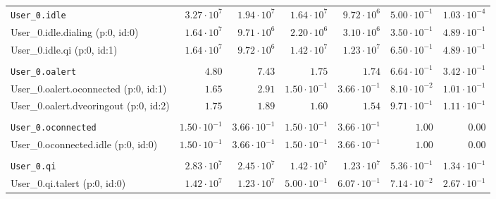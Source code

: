 \begin{table}[htbp]
{\begin{tabular}{lrrrrrr}
\\[-8pt]\texttt{User\_0.idle}                        &  $3.27 \cdot 10^{7}$ &  $1.94 \cdot 10^{7}$ &  $1.64 \cdot 10^{7}$ &  $9.72 \cdot 10^{6}$ & $5.00 \cdot 10^{-1}$ & $1.03 \cdot 10^{-4}$ \\
\hspace{3mm}User\_0.idle.dialing (p:0, id:0)         &  $1.64 \cdot 10^{7}$ &  $9.71 \cdot 10^{6}$ &  $2.20 \cdot 10^{6}$ &  $3.10 \cdot 10^{6}$ & $3.50 \cdot 10^{-1}$ & $4.89 \cdot 10^{-1}$ \\
\hspace{3mm}User\_0.idle.qi (p:0, id:1)              &  $1.64 \cdot 10^{7}$ &  $9.72 \cdot 10^{6}$ &  $1.42 \cdot 10^{7}$ &  $1.23 \cdot 10^{7}$ & $6.50 \cdot 10^{-1}$ & $4.89 \cdot 10^{-1}$ \\
\\[-8pt]\texttt{User\_0.oalert}                      &               $4.80$ &               $7.43$ &               $1.75$ &               $1.74$ & $6.64 \cdot 10^{-1}$ & $3.42 \cdot 10^{-1}$ \\
\hspace{3mm}User\_0.oalert.oconnected (p:0, id:1)    &               $1.65$ &               $2.91$ & $1.50 \cdot 10^{-1}$ & $3.66 \cdot 10^{-1}$ & $8.10 \cdot 10^{-2}$ & $1.01 \cdot 10^{-1}$ \\
\hspace{3mm}User\_0.oalert.dveoringout (p:0, id:2)   &               $1.75$ &               $1.89$ &               $1.60$ &               $1.54$ & $9.71 \cdot 10^{-1}$ & $1.11 \cdot 10^{-1}$ \\
\\[-8pt]\texttt{User\_0.oconnected}                  & $1.50 \cdot 10^{-1}$ & $3.66 \cdot 10^{-1}$ & $1.50 \cdot 10^{-1}$ & $3.66 \cdot 10^{-1}$ &               $1.00$ &               $0.00$ \\
\hspace{3mm}User\_0.oconnected.idle (p:0, id:0)      & $1.50 \cdot 10^{-1}$ & $3.66 \cdot 10^{-1}$ & $1.50 \cdot 10^{-1}$ & $3.66 \cdot 10^{-1}$ &               $1.00$ &               $0.00$ \\
\\[-8pt]\texttt{User\_0.qi}                          &  $2.83 \cdot 10^{7}$ &  $2.45 \cdot 10^{7}$ &  $1.42 \cdot 10^{7}$ &  $1.23 \cdot 10^{7}$ & $5.36 \cdot 10^{-1}$ & $1.34 \cdot 10^{-1}$ \\
\hspace{3mm}User\_0.qi.talert (p:0, id:0)            &  $1.42 \cdot 10^{7}$ &  $1.23 \cdot 10^{7}$ & $5.00 \cdot 10^{-1}$ & $6.07 \cdot 10^{-1}$ & $7.14 \cdot 10^{-2}$ & $2.67 \cdot 10^{-1}$ \\

\end{tabular}}
\end{table}
